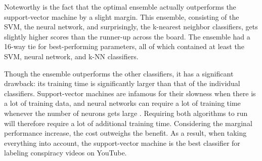 \documentclass[../main.tex]{subfiles}
\begin{document}
Noteworthy is the fact that the optimal ensemble actually outperforms the support-vector machine by a
slight margin. This ensemble, consisting of the SVM, the neural network, and surprisingly, the k-nearest
neighbor classifiers, gets slightly higher scores than the runner-up across the board. The ensemble had
a 16-way tie for best-performing parameters, all of which contained at least the SVM, neural network,
and k-NN classifiers. 

Though the ensemble outperforms the other classifiers, it has a significant drawback: its training time
is significantly larger than that of the individual classifiers. Support-vector machines are infamous
for their slowness when there is a lot of training data, and neural networks can require a lot of
training time whenever the number of neurons gets large \citep{burges1997improving,
kamarthi1999accelerating}. Requiring both algorithms to run will therefore require a lot of additional
training time. Considering the marginal performance increase, the cost outweighs the benefit. As a
result, when taking everything into account, the support-vector machine is the best classifier for
labeling conspiracy videos on YouTube.  
\end{document}
